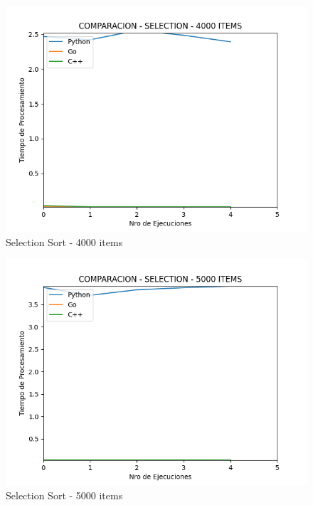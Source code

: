 \documentclass[12pt]{article} %
\begin{document}
    \vspace{5mm}
    
    \begin{figure}[H]
    \centering
    \includegraphics[width=\textwidth]{selection_4000}
    \caption{Selection Sort - 4000 items}
    \end{figure}

    \vspace{5mm}
    
    \begin{figure}[H]
    \centering
    \includegraphics[width=\textwidth]{selection_5000}
    \caption{Selection Sort - 5000 items}
    \end{figure}
\end{document}
